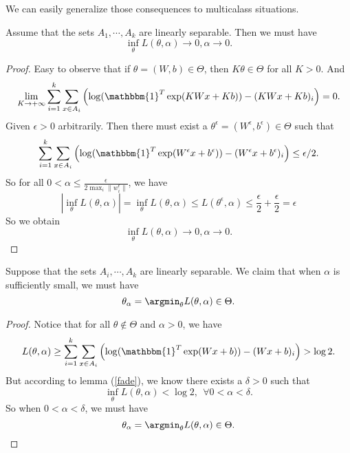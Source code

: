 We can easily generalize those consequences to multicalass situations.
\begin{lemma}{\label{fade}}
	Assume that the sets $A_1,\cdots,A_k$ are linearly separable. Then we must have
	\begin{equation}
	\inf_{\theta} L(\theta,\alpha) \rightarrow 0, \alpha \rightarrow 0.
	\end{equation}
\end{lemma}
\begin{proof}
	Easy to observe that if $\theta = (W,b)\in \Theta$, then $K\theta \in \Theta$ for all $K>0$. And
	\begin{equation}
	\lim\limits_{K\rightarrow +\infty} \displaystyle\sum_{i=1}^k \displaystyle\sum_{x\in A_i} 
	\left(\log(\mathbbm{1}^T\exp(KW x + Kb)) - (KW x + Kb)_i\right) = 0.
	\end{equation}
	Given $\epsilon>0$ arbitrarily. Then there must exist a $\theta^{\epsilon} = (W^{\epsilon},b^{\epsilon}) \in \Theta$ such that 
	\begin{equation}
	\displaystyle\sum_{i=1}^k \displaystyle\sum_{x\in A_i} 
	\left(\log(\mathbbm{1}^T\exp(W^{\epsilon} x + b^{\epsilon})) - (W^{\epsilon} x + b^{\epsilon})_i\right) \leq \epsilon/2.
	\end{equation}
	So for all $0 < \alpha \leq \frac{\epsilon}{2\max_i \|w^{\epsilon}_i\|}$, we have
	\begin{equation}
	|\inf_{\theta} L(\theta,\alpha)| = \inf_{\theta} L(\theta,\alpha) \leq L(\theta^{\epsilon},\alpha) \leq \frac{\epsilon}{2} + \frac{\epsilon}{2} = \epsilon
	\end{equation}
	So we obtain
	\[
	\inf_{\theta} L(\theta,\alpha) \rightarrow 0, \alpha \rightarrow 0.
	\]
\end{proof}

\begin{lemma}
	Suppose that the sets $A_i,\cdots,A_k$ are linearly separable. We claim that when $\alpha$ is sufficiently small, we must have
	\begin{equation}
	\theta_\alpha = \argmin_{\theta} L(\theta,\alpha) \in \Theta.
	\end{equation}
\end{lemma}

\begin{proof}
	Notice that for all $\theta \notin \Theta$ and $\alpha>0$, we have
	\begin{equation}
	L(\theta,\alpha) \geq \displaystyle\sum_{i=1}^k \displaystyle\sum_{x\in A_i} 
	\left(\log(\mathbbm{1}^T\exp(W x + b)) - (W x + b)_i\right) > \log 2.
	\end{equation}
	But according to lemma (\ref{fade}), we know there exists a $\delta>0$ such that 
	\begin{equation}
	\inf_{\theta} L(\theta,\alpha) < \log 2,~~\forall 0< \alpha < \delta.
	\end{equation} 
	So when $0< \alpha < \delta$, we must have
	\[
	\theta_\alpha = \argmin_{\theta} L(\theta,\alpha) \in \Theta.
	\]
\end{proof}

